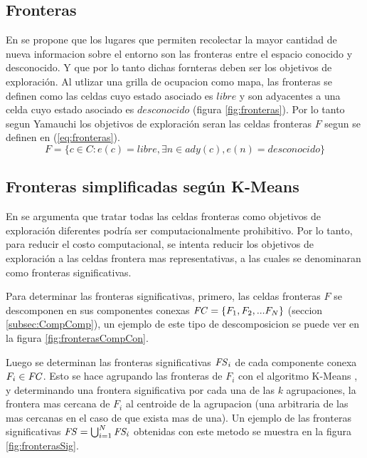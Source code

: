 \subsection{Fronteras}
En \cite{yamauchi1998frontier} se propone que los lugares que permiten
recolectar la mayor cantidad de nueva informacion sobre el entorno son las
fronteras entre el espacio conocido y desconocido. Y que por lo tanto dichas
fornteras deben ser los objetivos de exploración.
Al utlizar una grilla de ocupacion como mapa, las fronteras se definen como las
celdas cuyo estado asociado es $libre$ y son adyacentes a una celda cuyo estado
asociado es $desconocido$ (figura \ref{fig:fronteras}).
Por lo tanto segun Yamauchi los objetivos de exploración seran las celdas
fronteras $F$ segun se definen en (\ref{eq:fronteras}).
\begin{equation} 
  F = \{ c \in C : e(c) = libre, \exists n \in ady(c), e(n) = desconocido  \}
  \label{eq:fronteras}
\end{equation}

\subsection{Fronteras simplificadas según K-Means}
En \cite{amorin2019novel} se argumenta que tratar todas las celdas fronteras
como objetivos de exploración diferentes podría ser computacionalmente
prohibitivo. Por lo tanto, para reducir el costo computacional, se intenta
reducir los objetivos de exploración a las celdas frontera mas representativas,
a las cuales se denominaran como fronteras significativas.

Para determinar las fronteras significativas, primero, las celdas fronteras $F$
se descomponen en sus componentes conexas $\mathit{FC}=\{F_1,F_2,...F_N\}$
(seccion \ref{subsec:CompComp}), un ejemplo de este tipo de descomposicion se
puede ver en la figura \ref{fig:fronterasCompCon}.

Luego se determinan las fronteras significativas $\mathit{FS}_i$ de cada
componente conexa $F_i\in \mathit{FC}$. Esto se hace agrupando las fronteras de
$F_i$ con el algoritmo K-Means \cite{macqueen1967some}, y determinando una
frontera significativa por cada una de las $k$ agrupaciones, la
frontera mas cercana de $F_i$ al centroide de la agrupacion (una arbitraria de
las mas cercanas en el caso de que exista mas de una). Un ejemplo de las
fronteras significativas  $\mathit{FS} = \bigcup_{i=1}^N \mathit{FS_i}$ obtenidas con
este metodo se muestra en la figura \ref{fig:fronterasSig}.

